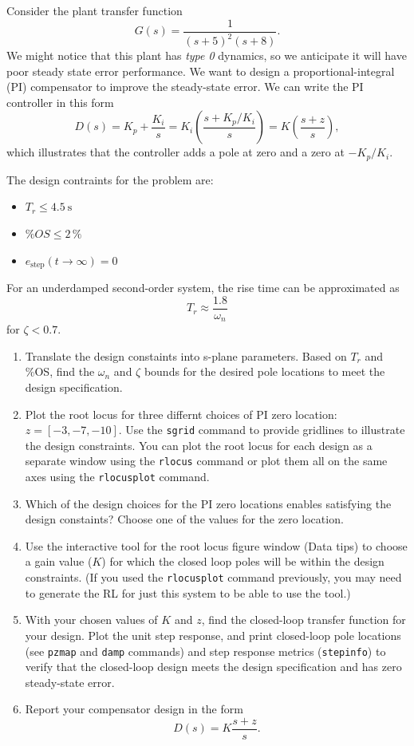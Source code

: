 \documentclass[11pt]{article}
\begin{document}
Consider the plant transfer function
\[
G(s) = \frac{1}{(s+5)^2 (s+8)}.
\]
We might notice that this plant has \emph{type 0} dynamics, so we anticipate it will have poor steady state error performance.
We want to design a proportional-integral (PI) compensator to improve the steady-state error.  We can write the PI controller in this form
\[
D(s) = K_p + \frac{K_i}{s} = K_i \left(\frac{s + K_p/K_i}{s}\right) = K \left(\frac{s+z}{s}\right),
\]
which illustrates that the controller adds a pole at zero and a zero at $-K_p/K_i$.

The design contraints for the problem are:
\begin{itemize}
\item $T_r \leq 4.5 \: \text{s}$
\item $\%OS \leq 2 \, \%$
\item $e_{\text{step}}(t \rightarrow \infty) = 0$
\end {itemize}


For an underdamped second-order system, the rise time can be approximated as
\[ T_r \approx \frac{1.8}{\omega_n}
\]
for $\zeta < 0.7$.


\begin{enumerate}
\item Translate the design constaints into s-plane parameters.  Based on $T_r$ and \%OS, find the $\omega_n$ and $\zeta$ bounds for the desired pole locations to meet the design specification.
\item Plot the root locus for three differnt choices of PI zero location: $z = [-3, -7, -10]$.  Use the \texttt{sgrid} command to provide gridlines to illustrate the design constraints.  You can plot the root locus for each design as a separate window using the \texttt{rlocus} command or plot them all on the same axes using the \texttt{rlocusplot} command.
\item Which of the design choices for the PI zero locations enables satisfying the design constaints?   Choose one of the values for the zero location.
\item Use the interactive tool for the root locus figure window (Data tips) to choose a gain value ($K$) for which the closed loop poles will be within the design constraints. (If you used the \texttt{rlocusplot} command previously, you may need to generate the RL for just this system to be able to use the tool.)
\item With your chosen values of $K$ and $z$, find the closed-loop transfer function for your design.  Plot the unit step response, and print closed-loop pole locations (see \texttt{pzmap} and \texttt{damp} commands) and step response metrics (\texttt{stepinfo}) to verify that the closed-loop design meets the design specification and has zero steady-state error.
\item Report your compensator design in the form
  \[D(s) = K \frac{s+z}{s}.\]
\end{enumerate}
\end{document}
